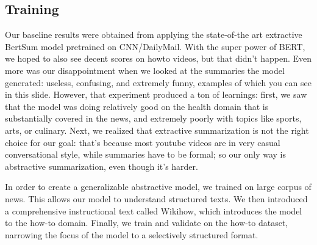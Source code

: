 \documentclass{article}
\begin{document}
\subsection{Training}
Our baseline results were obtained from applying the state-of-the art extractive BertSum model pretrained on CNN/DailyMail. With the super power of BERT, we hoped to also see decent scores on howto videos, but that didn’t happen. Even more was our disappointment when we looked at the summaries the model generated: useless, confusing, and extremely funny, examples of which you can see in this slide. However, that experiment produced a ton of learnings: first, we saw that the model was doing relatively good on the health domain that is substantially covered in the news, and extremely poorly with topics like sports, arts, or culinary. Next, we realized that extractive summarization is not the right choice for our goal: that’s because most youtube videos are in very casual conversational style, while summaries have to be formal; so our only way is abstractive summarization, even though it’s harder. 

In order to create a generalizable abstractive model, we trained on large corpus of news. This allows our model to understand structured texts. We then introduced a comprehensive instructional text called Wikihow, which introduces the model to the how-to domain. Finally, we train and validate on the how-to dataset, narrowing the focus of the model to a selectively structured format. 
\end{document}
